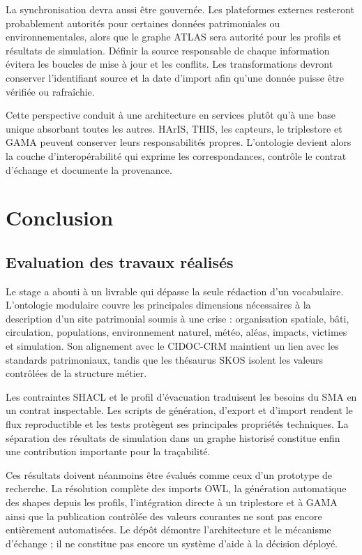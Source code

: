 \documentclass{article}
\begin{document}
La synchronisation devra aussi être gouvernée. Les plateformes externes resteront probablement autorités pour certaines données patrimoniales ou environnementales, alors que le graphe ATLAS sera autorité pour les profils et résultats de simulation. Définir la source responsable de chaque information évitera les boucles de mise à jour et les conflits. Les transformations devront conserver l'identifiant source et la date d'import afin qu'une donnée puisse être vérifiée ou rafraîchie.

Cette perspective conduit à une architecture en services plutôt qu'à une base unique absorbant toutes les autres. HArIS, THIS, les capteurs, le triplestore et GAMA peuvent conserver leurs responsabilités propres. L'ontologie devient alors la couche d'interopérabilité qui exprime les correspondances, contrôle le contrat d'échange et documente la provenance.

\clearpage
\section{Conclusion}
\subsection{Evaluation des travaux réalisés}

Le stage a abouti à un livrable qui dépasse la seule rédaction d'un vocabulaire. L'ontologie modulaire couvre les principales dimensions nécessaires à la description d'un site patrimonial soumis à une crise : organisation spatiale, bâti, circulation, populations, environnement naturel, météo, aléas, impacts, victimes et simulation. Son alignement avec le CIDOC-CRM maintient un lien avec les standards patrimoniaux, tandis que les thésaurus SKOS isolent les valeurs contrôlées de la structure métier.

Les contraintes SHACL et le profil d'évacuation traduisent les besoins du SMA en un contrat inspectable. Les scripts de génération, d'export et d'import rendent le flux reproductible et les tests protègent ses principales propriétés techniques. La séparation des résultats de simulation dans un graphe historisé constitue enfin une contribution importante pour la traçabilité.

Ces résultats doivent néanmoins être évalués comme ceux d'un prototype de recherche. La résolution complète des imports OWL, la génération automatique des shapes depuis les profils, l'intégration directe à un triplestore et à GAMA ainsi que la publication contrôlée des valeurs courantes ne sont pas encore entièrement automatisées. Le dépôt démontre l'architecture et le mécanisme d'échange ; il ne constitue pas encore un système d'aide à la décision déployé.
\end{document}
